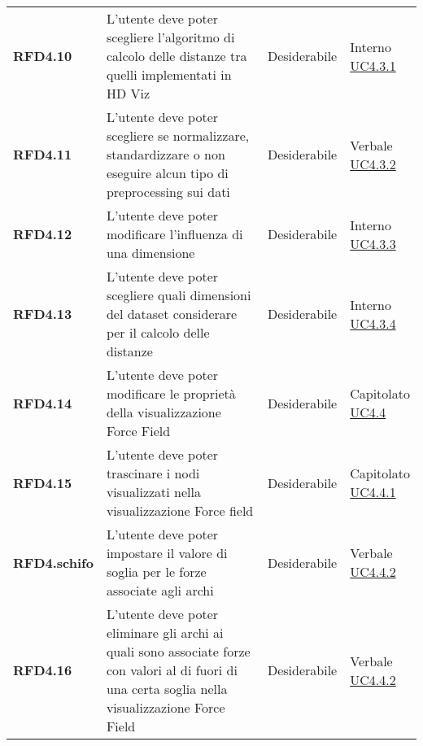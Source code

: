 \begin{longtable}[H]{>{\raggedright\bfseries}m{20mm} >{\raggedright}m{90mm} >{\raggedright}m{28mm} >{\raggedright\arraybackslash}m{30mm}}
    RFD4.10
    & L'utente deve poter scegliere l'algoritmo di calcolo delle distanze tra quelli implementati in HD Viz
    & Desiderabile
    & \makecell{ Interno \\ \hyperref[par:uc4.3.1]{UC4.3.1} }\\

    RFD4.11
    & L'utente deve poter scegliere se normalizzare, standardizzare o non eseguire alcun tipo di preprocessing sui dati
    & Desiderabile
    & \makecell{ Verbale \\ \hyperref[par:uc4.3.2]{UC4.3.2} }\\

    RFD4.12
    & L'utente deve poter modificare l'influenza di una dimensione
    & Desiderabile
    & \makecell{ Interno \\ \hyperref[par:uc4.3.3]{UC4.3.3} }\\

    RFD4.13
    & L'utente deve poter scegliere quali dimensioni del dataset considerare per il calcolo delle distanze
    & Desiderabile
    & \makecell{ Interno \\ \hyperref[par:uc4.3.2]{UC4.3.4} }\\

    RFD4.14
    & L'utente deve poter modificare le proprietà della visualizzazione Force Field
    & Desiderabile
    & \makecell{ Capitolato \\ \hyperref[ssub:uc4.4]{UC4.4} }\\

    RFD4.15
    & L'utente deve poter trascinare i nodi visualizzati nella visualizzazione Force field
    & Desiderabile
    & \makecell{ Capitolato \\ \hyperref[par:uc4.4.1]{UC4.4.1} }\\

    RFD4.schifo
    & L'utente deve poter impostare il valore di soglia per le forze associate agli archi
    & Desiderabile
    & \makecell{ Verbale \\ \hyperref[par:uc4.4.2]{UC4.4.2} }\\

    RFD4.16
    & L'utente deve poter eliminare gli archi ai quali sono associate forze con valori al di fuori di una certa soglia 
    nella visualizzazione Force Field
    & Desiderabile
    & \makecell{ Verbale \\ \hyperref[par:uc4.4.2]{UC4.4.2} }\\


\end{longtable}
